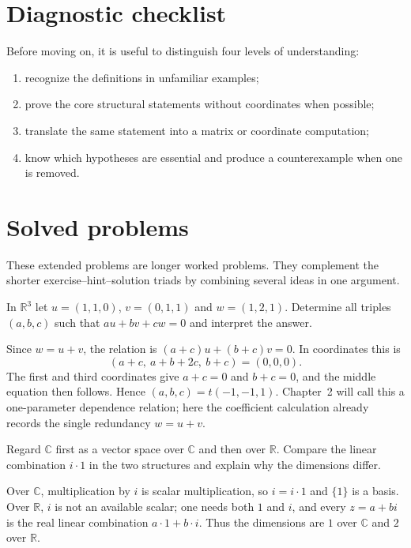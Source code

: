 \section{Diagnostic checklist}
Before moving on, it is useful to distinguish four levels of understanding:
\begin{enumerate}
\item recognize the definitions in unfamiliar examples;
\item prove the core structural statements without coordinates when possible;
\item translate the same statement into a matrix or coordinate computation;
\item know which hypotheses are essential and produce a counterexample when one is removed.
\end{enumerate}

\section{Solved problems}
These extended problems are longer worked problems. They complement the shorter exercise--hint--solution triads by combining several ideas in one argument.

\begin{problem}\label{prob:i01-problem-01}
In $\mathbb R^3$ let $u=(1,1,0)$, $v=(0,1,1)$ and $w=(1,2,1)$. Determine all triples $(a,b,c)$ such that $au+bv+cw=0$ and interpret the answer.
\end{problem}
\begin{solution}
Since $w=u+v$, the relation is $(a+c)u+(b+c)v=0$. In coordinates this is
\[
(a+c,\ a+b+2c,\ b+c)=(0,0,0).
\]
The first and third coordinates give $a+c=0$ and $b+c=0$, and the middle equation then follows. Hence $(a,b,c)=t(-1,-1,1)$. Chapter~2 will call this a one-parameter dependence relation; here the coefficient calculation already records the single redundancy $w=u+v$.
\end{solution}

\begin{problem}\label{prob:i01-problem-02}
Regard $\mathbb C$ first as a vector space over $\mathbb C$ and then over $\mathbb R$. Compare the linear combination $i\cdot 1$ in the two structures and explain why the dimensions differ.
\end{problem}
\begin{solution}
Over $\mathbb C$, multiplication by $i$ is scalar multiplication, so $i=i\cdot1$ and $\{1\}$ is a basis. Over $\mathbb R$, $i$ is not an available scalar; one needs both $1$ and $i$, and every $z=a+bi$ is the real linear combination $a\cdot1+b\cdot i$. Thus the dimensions are $1$ over $\mathbb C$ and $2$ over $\mathbb R$.
\end{solution}

